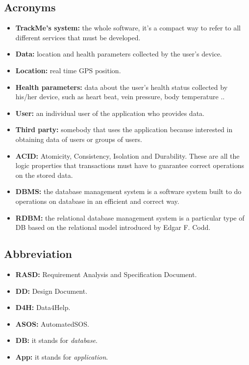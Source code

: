 \subsection{Acronyms}
\begin{itemize}
	\item{\textbf{TrackMe's system:} the whole software, it's a compact way to refer to all different services that must be developed.}
	
	\item {\textbf{Data:} location and health parameters collected by the user's device.}
	\item {\textbf{Location:} real time GPS position.}
	\item {\textbf{Health parameters:} data about the user's health status collected by his/her device, such as heart beat, 	vein pressure, body temperature ..}

	\item {\textbf{User:} an individual user of the application who provides data.}
	\item {\textbf{Third party:} somebody that uses the application because interested in obtaining data of users or groups of users.} 

	\item \textbf{ACID:} Atomicity, Consistency, Isolation and Durability. These are all the logic properties that transactions must 	have to guarantee correct operations on the stored data.
	\item \textbf{DBMS:} the database management system is a software system built to do operations on database in an efficient and correct way.
	\item \textbf{RDBM:} the relational database management system is a particular type of DB based on the relational model introduced by Edgar F. Codd.
\end{itemize}

\subsection{Abbreviation}
\begin{itemize}
	\item {\textbf {RASD:} Requirement Analysis and Specification Document.}
	\item {\textbf {DD:} Design Document.}
	\item {\textbf {D4H:} Data4Help.} 
	\item {\textbf {ASOS:} AutomatedSOS.}
	\item \textbf{DB:} it stands for \textit{database}.
	\item \textbf{App:} it stands for \textit{application}.
\end{itemize}